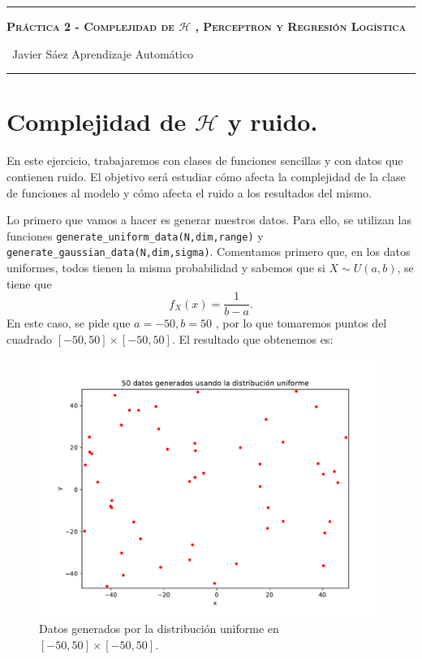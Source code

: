 \documentclass[12pt]{article}
\begin{document}
\begin{center}
	\hrule
	\vspace{.4cm}
	{\textbf { \large \scshape{ Práctica 2 - Complejidad de $\mathcal{H}$ , Perceptron y Regresión Logística}}}
\end{center}
{\ Javier Sáez \hspace{\fill} Aprendizaje Automático  \\
	\hrule


\section*{Complejidad de $\mathcal{H}$ y ruido.}

En este ejercicio, trabajaremos con clases de funciones sencillas y con datos que contienen ruido. El objetivo será estudiar cómo afecta 
la complejidad de la clase de funciones al modelo y cómo afecta el ruido a los resultados del mismo.

Lo primero que vamos a hacer es generar nuestros datos. Para ello, se utilizan las funciones \lstinline{generate_uniform_data(N,dim,range)} y \lstinline{generate_gaussian_data(N,dim,sigma)}. Comentamos primero que, en los datos uniformes, todos tienen la misma probabilidad y sabemos que si $X \sim U(a,b)$, se tiene que 
$$
f_X(x) = \frac{1}{b-a}.
$$
En este caso, se pide que $a = -50,b=50$ , por lo que tomaremos puntos del cuadrado $[-50,50] \times [-50,50]$. El resultado que obtenemos es:
\begin{figure}[H]
\centering
\includegraphics[scale = 0.4]{media/50-datos-uniforme.pdf}
\caption{Datos generados por la distribución uniforme en $[-50,50] \times [-50,50]$.}
\end{figure}

}
\end{document}
